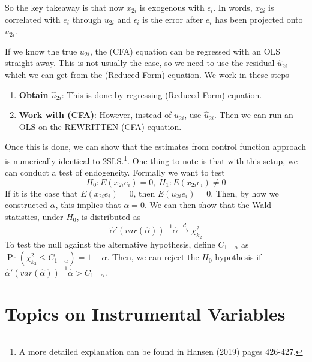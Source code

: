 \documentclass[12pt]{article}
\theoremstyle{definition}
\theoremstyle{property}
\theoremstyle{assumption}
\theoremstyle{example}
\theoremstyle{comment}
\begin{document}
So the key takeaway is that now $x_{2i}$ is exogenous with $\epsilon_i$. In words, $x_{2i}$ is correlated with $e_i$ through $u_{2i}$ and $\epsilon_i$ is the error after $e_i$ has been projected onto $u_{2i}$.  \par
If we know the true $u_{2i}$, the (CFA) equation can be regressed with an OLS straight away. This is not usually the case, so we need to use the residual $\hat{u}_{2i}$ which we can get from the (Reduced Form) equation. We work in these steps
\begin{enumerate}
\item \textbf{Obtain $\hat{u}_{2i}$}: This is done by regressing (Reduced Form) equation. 
\item \textbf{Work with (CFA)}: However, instead of $u_{2i}$, use $\hat{u}_{2i}$. Then we can run an OLS on the REWRITTEN (CFA) equation. 
\end{enumerate}\par
Once this is done, we can show that the estimates from control function approach is numerically identical to 2SLS.\footnote{A more detailed explanation can be found in Hansen (2019) pages 426-427.}. 
One thing to note is that with this setup, we can conduct a test of endogeneity. Formally we want to test
\[
H_0: E(x_{2i}e_i)=0, \ H_1:E(x_{2i}e_i)\neq0
\]
If it is the case that $E(x_{2i}e_i)=0$, then $E(u_{2i}e_i)=0$. Then, by how we constructed $\alpha$, this implies that $\alpha=0$. We can then show that the Wald statistics, under $H_0$, is distributed as
\[
\hat{\alpha}'(var(\hat{\alpha}))^{-1}\hat{\alpha}\xrightarrow{d}\chi^2_{k_2}
\]
To test the null against the alternative hypothesis, define $C_{1-\alpha}$ as $\Pr(\chi_{k_2}^2\leq C_{1-\alpha})=1-\alpha$. Then, we can reject the $H_0$ hypothesis if $\hat{\alpha}'(var(\hat{\alpha}))^{-1}\hat{\alpha}>C_{1-\alpha}$.

\section{Topics on Instrumental Variables}
\end{document}
